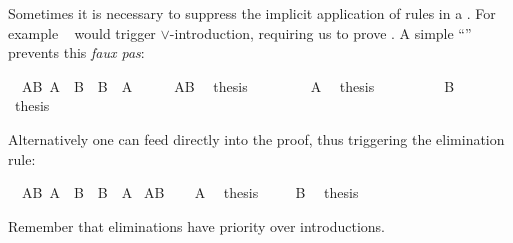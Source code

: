 \begin{isabellebody}
\begin{isamarkuptext}
Sometimes it is necessary to suppress the implicit application of rules in a
. For example ~ would
trigger $\lor$-introduction, requiring us to prove . A simple
``\isa{{\isacharminus}}'' prevents this \emph{faux pas}:%
\end{isamarkuptext}%
\isamarkuptrue%
\isamarkupfalse%
\ \ AB{\isacharcolon}\ {\isachardoublequoteopen}A\ {\isasymor}\ B{\isachardoublequoteclose}\ \ {\isachardoublequoteopen}B\ {\isasymor}\ A{\isachardoublequoteclose}\isanewline
%
\isadelimproof
%
\endisadelimproof
%
\isatagproof
{}\isamarkupfalse%
\ {\isacharminus}\isanewline
\ \ \isamarkupfalse%
\ AB\ \isamarkupfalse%
\ {\isacharquery}thesis\isanewline
\ \ \isamarkupfalse%
\isanewline
\ \ \ \ \isamarkupfalse%
\ A\ \isamarkupfalse%
\ {\isacharquery}thesis\ \isacommand{{\isachardot}{\isachardot}}\isamarkupfalse%
\isanewline
\ \ \isamarkupfalse%
\isanewline
\ \ \ \ \isamarkupfalse%
\ B\ \isamarkupfalse%
\ {\isacharquery}thesis\ \isacommand{{\isachardot}{\isachardot}}\isamarkupfalse%
\isanewline
\ \ \isamarkupfalse%
\isanewline
{}\isamarkupfalse%
%
\endisatagproof
{\isafoldproof}%
%
\isadelimproof
%
\endisadelimproof
%
\begin{isamarkuptext}%
\noindent Alternatively one can feed  directly
into the proof, thus triggering the elimination rule:%
\end{isamarkuptext}%
\isamarkuptrue%
\isamarkupfalse%
\ \ AB{\isacharcolon}\ {\isachardoublequoteopen}A\ {\isasymor}\ B{\isachardoublequoteclose}\ \ {\isachardoublequoteopen}B\ {\isasymor}\ A{\isachardoublequoteclose}\isanewline
%
\isadelimproof
%
\endisadelimproof
%
\isatagproof
{}\isamarkupfalse%
\ AB\isanewline
{}\isamarkupfalse%
\isanewline
\ \ \isamarkupfalse%
\ A\ \isamarkupfalse%
\ {\isacharquery}thesis\ \isacommand{{\isachardot}{\isachardot}}\isamarkupfalse%
\isanewline
{}\isamarkupfalse%
\isanewline
\ \ \isamarkupfalse%
\ B\ \isamarkupfalse%
\ {\isacharquery}thesis\ \isacommand{{\isachardot}{\isachardot}}\isamarkupfalse%
\isanewline
{}\isamarkupfalse%
%
\endisatagproof
{\isafoldproof}%
%
\isadelimproof
%
\endisadelimproof
%
\begin{isamarkuptext}%
\noindent Remember that eliminations have priority over
introductions.


\end{isamarkuptext}
\end{isabellebody}
